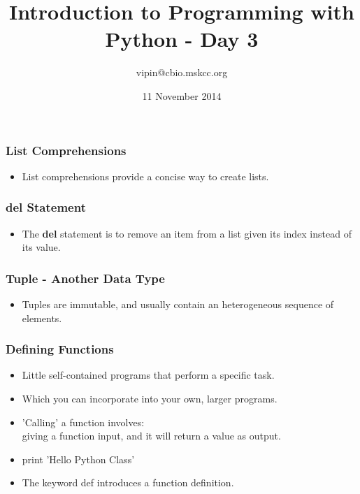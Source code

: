 \documentclass[11pt]{beamer}
\title[pyClass1]{Introduction to Programming with Python - Day 3}
\author{vipin@cbio.mskcc.org}
\institute[cBio@MSKCC]
{
    R{\"a}tsch Laboratory, Computational Biology Center\\
    Memorial Sloan Kettering Cancer Center\\
}
\date{11 November 2014}
\begin{document}
\maketitle
%
\begin{frame}[plain]
    \frametitle{List Comprehensions}
    \begin{itemize}
        \item[] List comprehensions provide a concise way to create lists. 
        
        
        
        
    \end{itemize}
\end{frame}
%
\begin{frame}[plain]
    \frametitle{del Statement}
    \begin{itemize}
        \item[] The \textbf{del} statement is to remove an item from a list given its index instead of its value.
        \newline
        
    \end{itemize}
\end{frame}
\begin{frame}[plain]
    \frametitle{Tuple - Another Data Type}
    \begin{itemize}
        \item[] Tuples are immutable, and usually contain an heterogeneous sequence of elements. 
        \newline
        
    \end{itemize}
\end{frame}
\begin{frame}[plain]
    \frametitle{Defining Functions}
    \begin{itemize}
        \item[]Little self-contained programs that perform a specific task. 
        \item[] Which you can incorporate into your own, larger programs.
        \newline
        \item[] 'Calling' a function involves: \\ 
        giving a function input, and it will return a value as output.
        \newline
        \item[] print 'Hello Python Class'
        \newline
        \item[] The keyword def introduces a function definition.
    \end{itemize}
\end{frame}
\end{document}
